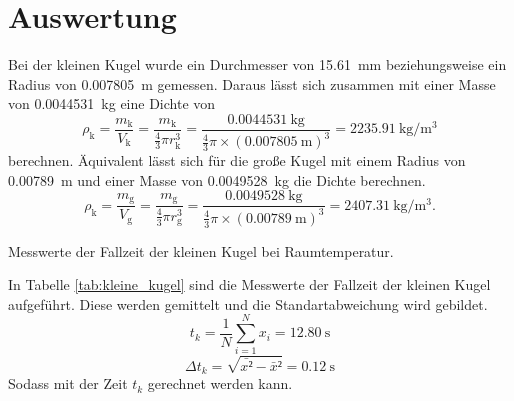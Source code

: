 \section{Auswertung}
\label{sec:Auswertung}
\newcommand{\kleineKugelDurchmesser}{\SI{15.61}{\milli\meter} }
\newcommand{\kleineKugelRadius}{\SI{0.007805}{\meter} }
\newcommand{\kleineKugelMasse}{\SI{0.0044531}{\kilo\gram} }
\newcommand{\kleineKugelDichte}{\SI{2235.91}{\kilo\gram\per\cubic\meter} }

\newcommand{\grosseKugelRadius}{\SI{0.00789}{\meter} }
\newcommand{\grosseKugelDurchmesser}{\SI{0.01578}{\meter} }
\newcommand{\grosseKugelMasse}{\SI{0.0049528}{\kilo\gram} }
\newcommand{\grosseKugelDichte}{\SI{2407.31}{\kilo\gram\per\cubic\meter} }

Bei der kleinen Kugel wurde ein Durchmesser von \kleineKugelDurchmesser beziehungsweise ein Radius von \kleineKugelRadius gemessen.
Daraus lässt sich zusammen mit einer Masse von \kleineKugelMasse eine Dichte von
\begin{equation*}
  \rho_\text{k}
  = \frac{m_\text{k}}{V_\text{k}}
  = \frac{m_\text{k}}{\frac{4}{3}\pi r_\text{k}^3}
  = \frac{\kleineKugelMasse}{\frac{4}{3}\pi\times(\kleineKugelRadius)^3}
  = \kleineKugelDichte
\end{equation*}
berechnen.
Äquivalent lässt sich für die große Kugel mit einem Radius von \grosseKugelRadius und einer Masse von \grosseKugelMasse die Dichte berechnen.
\begin{equation*}
  \rho_\text{k}
  = \frac{m_\text{g}}{V_\text{g}}
  = \frac{m_\text{g}}{\frac{4}{3}\pi r_\text{g}^3}
  = \frac{\grosseKugelMasse}{\frac{4}{3}\pi\times(\grosseKugelRadius)^3}
  = \grosseKugelDichte.
\end{equation*}

\begin{table}
  \centering
  
  \caption{Messwerte der Fallzeit der kleinen Kugel bei Raumtemperatur.}
  \label{tab:kleine_kugel}
\end{table}

\noindent In Tabelle \autoref{tab:kleine_kugel} sind die Messwerte der Fallzeit der kleinen Kugel aufgeführt.
Diese werden gemittelt und die Standartabweichung wird gebildet.
\begin{equation*}
  t_{k} = \frac{1}{N} \sum_{i=1}^{N}x_i =  \SI{12.80}{\second}
\end{equation*}
\begin{equation*}
  \Delta t_{k} = \sqrt{\bar{x²}-\bar{x}²} = \SI{0.12}{\second}
\end{equation*}
Sodass mit der Zeit $t_{k}$ gerechnet werden kann.

